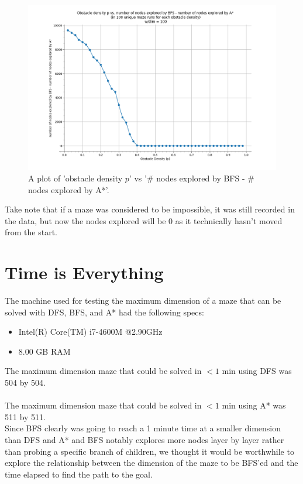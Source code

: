 \documentclass[11pt]{article}
\begin{document}
\begin{figure}[h]
\centering
\includegraphics[scale=0.55]{graphs/obstacleDensity_vs_nodesBFSminusNodesAstar.PNG}
\caption{A plot of 'obstacle density $p$' vs '\# nodes explored by BFS - \# nodes explored by A*'.}
\label{BFS-A}
\end{figure}

Take note that if a maze was considered to be impossible, it was still recorded in the data, but now the nodes explored will be 0 as it technically hasn't moved from the start.
	\pagebreak
\section{Time is Everything}
The machine used for testing the maximum dimension of a maze that can be solved with DFS, BFS, and A* had the following specs:
\begin{itemize}
\item Intel(R) Core(TM) i7-4600M @2.90GHz
\item 8.00 GB RAM
\end{itemize}
The maximum dimension maze that could be solved in $<1$ min using DFS was 504 by 504.\\\\
The maximum dimension maze that could be solved in $<1$ min using A* was 511 by 511.\\

Since BFS clearly was going to reach a 1 minute time at a smaller dimension than DFS and A* and BFS notably explores more nodes layer by layer rather than probing a specific branch of children, we thought it would be worthwhile to explore the relationship between the dimension of the maze to be BFS'ed and the time elapsed to find the path to the goal.\\
\end{document}
